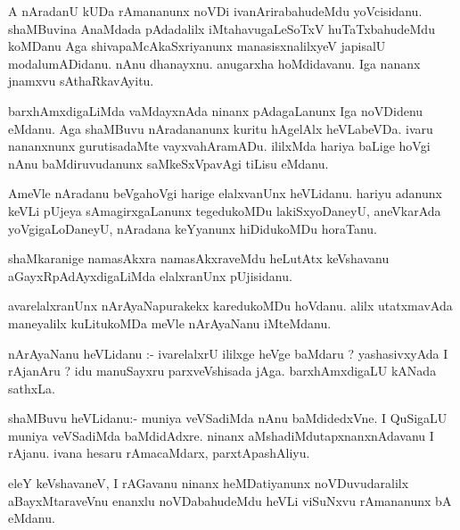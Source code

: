 \documentclass{article}
\begin{document}
\begin{mn}
A  nAradanU  kUDa  rAmananunx  noVDi  ivanArirabahudeMdu  yoVcisidanu.  shaMBuvina  AnaMdada  pAdadalilx  iMtahavugaLeSoTxV  huTaTxbahudeMdu  
koMDanu  Aga  shivapaMcAkaSxriyanunx    manasisxnalilxyeV  japisalU  modalumADidanu.  nAnu  dhanayxnu.  anugarxha hoMdidavanu.  
Iga  nananx  jnamxvu  sAthaRkavAyitu.
\end{mn}

\begin{mn}
barxhAmxdigaLiMda  vaMdayxnAda  ninanx  pAdagaLanunx  Iga  noVDidenu  eMdanu.  Aga  shaMBuvu  nAradananunx  kuritu  hAgelAlx  heVLabeVDa.  
ivaru  nananxnunx  gurutisadaMte  vayxvahAramADu.  ililxMda  hariya  baLige  hoVgi  nAnu  baMdiruvudanunx  saMkeSxVpavAgi  tiLisu  eMdanu.
\end{mn}

\begin{mn}
AmeVle  nAradanu  beVgahoVgi  harige  elalxvanUnx  heVLidanu.  hariyu  adanunx  keVLi  pUjeya  sAmagirxgaLanunx  tegedukoMDu  lakiSxyoDaneyU,  
aneVkarAda  yoVgigaLoDaneyU,  nAradana  keYyanunx  hiDidukoMDu  horaTanu.
\end{mn}

\begin{mn}
shaMkaranige  namasAkxra  namasAkxraveMdu  heLutAtx  keVshavanu  aGayxRpAdAyxdigaLiMda  elalxranUnx  pUjisidanu.
\end{mn}

\begin{mn}
avarelalxranUnx  nArAyaNapurakekx  karedukoMDu  hoVdanu.  alilx  utatxmavAda  maneyalilx  kuLitukoMDa  meVle  nArAyaNanu  iMteMdanu. 
\end{mn}

\begin{mn}
nArAyaNanu  heVLidanu :- ivarelalxrU  ililxge  heVge  baMdaru ?  yashasivxyAda  I  rAjanAru ?  idu  manuSayxru  parxveVshisada  jAga.  
barxhAmxdigaLU  kANada  sathxLa.
\end{mn}

\begin{mn}
shaMBuvu  heVLidanu:- muniya  veVSadiMda  nAnu  baMdidedxVne.  I  QuSigaLU  muniya  veVSadiMda  baMdidAdxre.  ninanx  
aMshadiMdutapxnanxnAdavanu  I  rAjanu.  ivana  hesaru  rAmacaMdarx,  parxtApashAliyu.
\end{mn}

\begin{mn}
eleY  keVshavaneV,  I  rAGavanu  ninanx  heMDatiyanunx  noVDuvudaralilx  aBayxMtaraveVnu  enanxlu  noVDabahudeMdu  heVLi  viSuNxvu  
rAmananunx  bA  eMdanu.
\end{mn}
\end{document}
